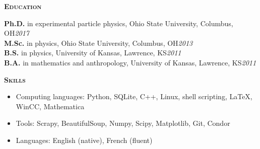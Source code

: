 \documentclass[line]{letter}
\begin{document}
{\vspace{3pt}\Large \textsc{\textbf{Education}}}%
\begin{addmargin}[1em]{1em}
{\bf \large Ph.D.} in experimental particle physics, Ohio State University, Columbus, OH\hfill {\large \it 2017}\vspace{1mm}\\
{\bf \large M.Sc.} in physics, Ohio State University, Columbus, OH\hfill {\large \it 2013}\vspace{1mm}\\
{\bf \large B.S.} in physics, University of Kansas, Lawrence, KS\hfill {\large \it 2011}\vspace{1mm}\\
{\bf \large B.A.} in mathematics and anthropology,  University of Kansas, Lawrence, KS\hfill {\large \it 2011}
\end{addmargin}

{\vspace{7pt}\Large  \textsc{\textbf{Skills}} }
\vspace{-2mm}
\begin{itemize}[leftmargin=5mm]%

\item Computing languages: Python, SQLite, C++, Linux, shell scripting, \LaTeX, WinCC, Mathematica
\item Tools: Scrapy, BeautifulSoup, Numpy, Scipy, Matplotlib, Git, Condor
\item Languages: English (native), French (fluent)
\end{itemize}

\end{document}
